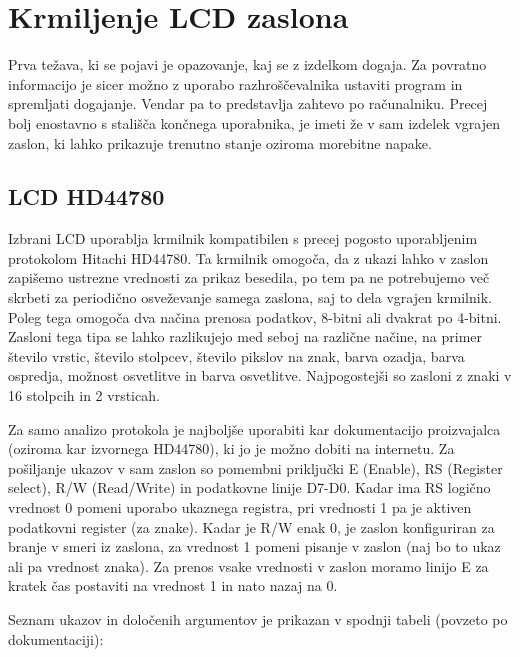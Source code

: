 \documentclass[12pt,a4paper,twoside,openright,slovene]{book}
\begin{document}
\section{Krmiljenje LCD zaslona}
Prva težava, ki se pojavi je opazovanje, kaj se z izdelkom dogaja. Za povratno informacijo je sicer možno z uporabo razhroščevalnika ustaviti program in spremljati dogajanje. Vendar pa to predstavlja zahtevo po računalniku. Precej bolj enostavno s stališča končnega uporabnika, je imeti že v sam izdelek vgrajen zaslon, ki lahko prikazuje trenutno stanje oziroma morebitne napake.


\subsection{LCD HD44780}
Izbrani LCD uporablja krmilnik kompatibilen s precej pogosto uporabljenim protokolom Hitachi HD44780. Ta krmilnik omogoča, da z ukazi lahko v zaslon zapišemo ustrezne vrednosti za prikaz besedila, po tem pa ne potrebujemo več skrbeti za periodično osveževanje samega zaslona, saj to dela vgrajen krmilnik. Poleg tega omogoča dva načina prenosa podatkov, 8-bitni ali dvakrat po 4-bitni. Zasloni tega tipa se lahko razlikujejo med seboj na različne načine, na primer število vrstic, število stolpcev, število pikslov na znak, barva ozadja, barva ospredja, možnost osvetlitve in barva osvetlitve. Najpogostejši so zasloni z znaki v 16 stolpcih in 2 vrsticah. 

Za samo analizo protokola je najboljše uporabiti kar dokumentacijo proizvajalca (oziroma kar izvornega HD44780), ki jo je možno dobiti na internetu. Za pošiljanje ukazov v sam zaslon so pomembni priključki E (Enable), RS (Register select), R/W (Read/Write) in podatkovne linije D7-D0. Kadar ima RS logično vrednost 0 pomeni uporabo ukaznega registra, pri vrednosti 1 pa je aktiven podatkovni register (za znake). Kadar je R/W enak 0, je zaslon konfiguriran za branje v smeri iz zaslona, za vrednost 1 pomeni pisanje v zaslon (naj bo to ukaz ali pa vrednost znaka). Za prenos vsake vrednosti v zaslon moramo linijo E za kratek čas postaviti na vrednost 1 in nato nazaj na 0.

Seznam ukazov in določenih argumentov je prikazan v spodnji tabeli (povzeto po dokumentaciji):
\end{document}
